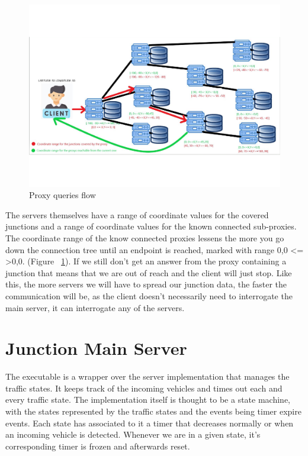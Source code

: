 \documentclass[17pt]{report}
\begin{document}
\begin{figure}[h!]
    \includegraphics[width=\textwidth]{Sketches/ProxyFlowV2.png}
    \caption{Proxy queries flow}
    \label{fig:Proxy queries flow}
\end{figure}

The servers themselves have a range of coordinate values for the covered junctions
and a range of coordinate values for the known connected sub-proxies. The coordinate 
range of the know connected proxies lessens the more you go down the connection tree 
until an endpoint is reached, marked with range {0,0} \textless = \textgreater {0,0}.
(Figure ~\ref{fig:Proxy queries flow}). If we still don't get 
an answer from the proxy containing a junction that means that we are out of reach 
and the client will just stop. Like this, the more servers we will have to spread our 
junction data, the faster the communication will be, as the client doesn't necessarily
need to interrogate the main server, it can interrogate any of the servers.
\pagebreak


\section{Junction Main Server}

\indent \indent
The executable is a wrapper over the server implementation that manages the traffic states.
It keeps track of the incoming vehicles and times out each and every traffic state. The 
implementation itself is thought to be a state machine, with the states represented by the 
traffic states and the events being timer expire events. Each state has associated to it 
a timer that decreases normally or when an incoming vehicle is detected. Whenever we 
are in a given state, it's corresponding timer is frozen and afterwards reset.
\end{document}
